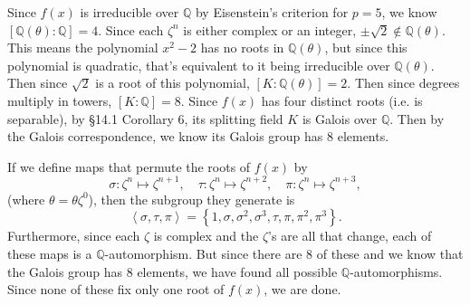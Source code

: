 \documentclass[twoside,10pt]{report}
\begin{document}
Since $f(x)$ is irreducible over $\mathbb{Q}$ by Eisenstein's criterion for $p=5$, we know $[\mathbb{Q}(\theta):\mathbb{Q}]=4$. Since each $\zeta^{n}$ is either complex or an integer, $\pm\sqrt{2} \not\in \mathbb{Q}(\theta)$. This means the polynomial $x^2-2$ has no roots in $\mathbb{Q}(\theta)$, but since this polynomial is quadratic, that's equivalent to it being irreducible over $\mathbb{Q}(\theta)$. Then since $\sqrt{2} $ is a root of this polynomial, $[K:\mathbb{Q}(\theta)]=2$. Then since degrees multiply in towers, $[K:\mathbb{Q}]=8$. Since $f(x)$ has four distinct roots (i.e. is separable), by \S 14.1 Corollary 6, its splitting field $K$ is Galois over $\mathbb{Q}$. Then by the Galois correspondence, we know its Galois group has 8 elements.

If we define maps that permute the roots of $f(x)$ by
\[
\sigma:\zeta^{n}\mapsto \zeta^{n+1}, \quad \tau:\zeta^{n}\mapsto \zeta^{n+2}, \quad \pi:\zeta^{n}\mapsto \zeta^{n+3},
\] (where $\theta=\theta\zeta^{0}$), then the subgroup they generate is
\[
\left\langle \sigma,\tau,\pi \right\rangle = \left\{ 1,\sigma,\sigma^{2},\sigma^{3},\tau,\pi,\pi^{2},\pi^{3} \right\}.
\] Furthermore, since each $\zeta$ is complex and the $\zeta$'s are all that change, each of these maps is a $\mathbb{Q}$-automorphism. But since there are 8 of these and we know that the Galois group has 8 elements, we have found all possible $\mathbb{Q}$-automorphisms. Since none of these fix only one root of $f(x)$, we are done.
\end{document}
